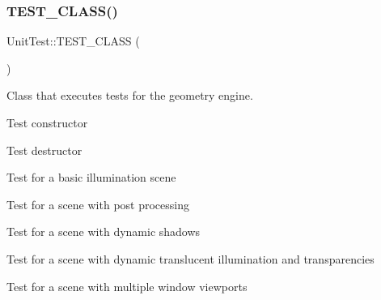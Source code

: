 \subsubsection{\texorpdfstring{TEST\_CLASS()}{TEST\_CLASS()}}
{\footnotesize\ttfamily Unit\+Test\+::\+T\+E\+S\+T\+\_\+\+C\+L\+A\+SS (\begin{DoxyParamCaption}\item[{Geometry\+Engine\+Tests}]{ }\end{DoxyParamCaption})}



Class that executes tests for the geometry engine. 

Test constructor

Test destructor

Test for a basic illumination scene

Test for a scene with post processing

Test for a scene with dynamic shadows

Test for a scene with dynamic translucent illumination and transparencies

Test for a scene with multiple window viewports 